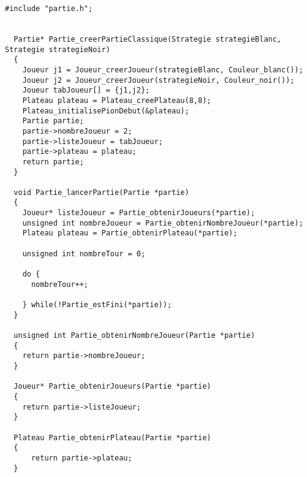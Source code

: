  
\begin{lstlisting}
#include "partie.h";


  Partie* Partie_creerPartieClassique(Strategie strategieBlanc, Strategie strategieNoir)
  {
    Joueur j1 = Joueur_creerJoueur(strategieBlanc, Couleur_blanc());
    Joueur j2 = Joueur_creerJoueur(strategieNoir, Couleur_noir());
    Joueur tabJoueur[] = {j1,j2};
    Plateau plateau = Plateau_creePlateau(8,8);
    Plateau_initialisePionDebut(&plateau);
    Partie partie;
    partie->nombreJoueur = 2;
    partie->listeJoueur = tabJoueur;
    partie->plateau = plateau;
    return partie;
  }

  void Partie_lancerPartie(Partie *partie)
  {
    Joueur* listeJoueur = Partie_obtenirJoueurs(*partie);
    unsigned int nombreJoueur = Partie_obtenirNombreJoueur(*partie);
    Plateau plateau = Partie_obtenirPlateau(*partie);

    unsigned int nombreTour = 0;

    do {
      nombreTour++;

    } while(!Partie_estFini(*partie));
  }

  unsigned int Partie_obtenirNombreJoueur(Partie *partie)
  {
    return partie->nombreJoueur;
  }

  Joueur* Partie_obtenirJoueurs(Partie *partie)
  {
    return partie->listeJoueur;
  }

  Plateau Partie_obtenirPlateau(Partie *partie)
  {
      return partie->plateau;
  }
\end{lstlisting}
 
